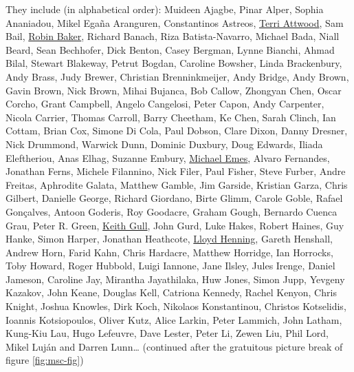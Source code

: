 \documentclass[
]{book}
\begin{document}
They include (in alphabetical order): Muideen Ajagbe, Pinar Alper, Sophia Ananiadou, Mikel Egaña Aranguren, Constantinos Astreos, \href{https://en.wikipedia.org/wiki/Terri_Attwood}{Terri Attwood}, Sam Bail, \href{https://en.wikipedia.org/wiki/Robin_Baker_(biologist)}{Robin Baker}, Richard Banach, Riza Batista-Navarro, Michael Bada, Niall Beard, Sean Bechhofer, Dick Benton, Casey Bergman, Lynne Bianchi, Ahmad Bilal, Stewart Blakeway, Petrut Bogdan, Caroline Bowsher, Linda Brackenbury, Andy Brass, Judy Brewer, Christian Brenninkmeijer, Andy Bridge, Andy Brown, Gavin Brown, Nick Brown, Mihai Bujanca, Bob Callow, Zhongyan Chen, Oscar Corcho, Grant Campbell, Angelo Cangelosi, Peter Capon, Andy Carpenter, Nicola Carrier, Thomas Carroll, Barry Cheetham, Ke Chen, Sarah Clinch, Ian Cottam, Brian Cox, Simone Di Cola, Paul Dobson, Clare Dixon, Danny Dresner, Nick Drummond, Warwick Dunn, Dominic Duxbury, Doug Edwards, Iliada Eleftheriou, Anas Elhag, Suzanne Embury, \href{https://www.uoguelph.ca/mcb/people/dr-michael-j-emes}{Michael Emes}, Alvaro Fernandes, Jonathan Ferns, Michele Filannino, Nick Filer, Paul Fisher, Steve Furber, Andre Freitas, Aphrodite Galata, Matthew Gamble, Jim Garside, Kristian Garza, Chris Gilbert, Danielle George, Richard Giordano, Birte Glimm, Carole Goble, Rafael Gonçalves, Antoon Goderis, Roy Goodacre, Graham Gough, Bernardo Cuenca Grau, Peter R. Green, \href{https://en.wikipedia.org/wiki/Keith_Gull}{Keith Gull}, John Gurd, Luke Hakes, Robert Haines, Guy Hanke, Simon Harper, Jonathan Heathcote, \href{https://github.com/eldog}{Lloyd Henning}, Gareth Henshall, Andrew Horn, Farid Kahn, Chris Hardacre, Matthew Horridge, Ian Horrocks, Toby Howard, Roger Hubbold, Luigi Iannone, Jane Ilsley, Jules Irenge, Daniel Jameson, Caroline Jay, Mirantha Jayathilaka, Huw Jones, Simon Jupp, Yevgeny Kazakov, John Keane, Douglas Kell, Catriona Kennedy, Rachel Kenyon, Chris Knight, Joshua Knowles, Dirk Koch, Nikolaos Konstantinou, Christos Kotselidis, Ioannis Kotsiopoulos, Oliver Kutz, Alice Larkin, Peter Lammich, John Latham, Kung-Kiu Lau, Hugo Lefeuvre, Dave Lester, Peter Li, Zewen Liu, Phil Lord, Mikel Luján and Darren Lunn\ldots{} (continued after the gratuitous picture break of figure \ref{fig:msc-fig})
\end{document}
